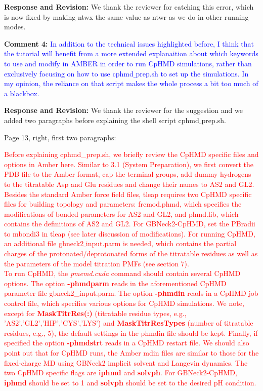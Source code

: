 \documentclass[11pt,letterpaper]{businessletter}
\begin{document}
\begin{letter}
\textbf{Response and Revision:} 
We thank the reviewer for catching this error, which is now fixed by making ntwx the same value as ntwr 
as we do in other running modes. 


\textbf{Comment 4:}
\textcolor{Blue}{
In addition to the technical issues highlighted before, I think that the tutorial will benefit from a more extended explanaition about which keywords to use and modify in AMBER in order to run CpHMD simulations, rather than exclusively focusing on how to use cphmd$\_$prep.sh to set up the simulations. In my opinion, the reliance on that script makes the whole process a bit too much of a blackbox.
}

\textbf{Response and Revision:} 
We thank the reviewer for the suggestion and we added two paragraphs before explaining the shell script cphmd$\_$prep.sh.

Page 13, right, first two paragraphs:

\textcolor{red}{
\indent Before explaining {cphmd\_prep.sh}, we briefly review the CpHMD specific files and options in Amber here.
Similar to 3.1 (System Preparation), we first convert the PDB file to the Amber format, cap the terminal groups, add dummy hydrogens to the titratable Asp and Glu residues and change their names to AS2 and GL2.
Besides the standard Amber force field files, tleap requires two CpHMD specific files for building topology and parameters:
{frcmod.phmd},
which specifies the modifications of bonded parameters for AS2 and GL2, 
and {phmd.lib}, which
contains the definitions of AS2 and GL2.
For GBNeck2-CpHMD, set the PBradii to mbondi3 in tleap (see later discussion of modifications). 
For running CpHMD, an additional file
{gbneck2$\_$input.parm} is needed, which contains the
partial charges of the protonated/deprotonated forms of the titratable residues as well as the parameters of the model titration PMFs (see section 7). 
\\
\indent
To run CpHMD, the \textit{pmemd.cuda} command should contain several CpHMD options.
The option
\textbf{-phmdparm} reads in 
the aforementioned CpHMD parameter file {gbneck2\_input.parm}.
The option \textbf{-phmdin} reads in
a CpHMD job control file, which specifies various options for CpHMD simulations. 
We note, except for  
\textbf{MaskTitrRes(:)} (titratable residue types, e.g., 'AS2','GL2','HIP','CYS','LYS')
and \textbf{MaskTitrResTypes} (number of titratable residues, e.g., 5), the default settings in the phmdin file should be kept.
Finally, if specified the option \textbf{-phmdstrt} reads in a CpHMD restart file.
We should also point out that 
for CpHMD runs, the Amber mdin files are
similar to those for the fixed-charge MD using GBNeck2 implicit solvent and Langevin dynamics. 
The two CpHMD specific flags are \textbf{iphmd} and \textbf{solvph}. 
For GBNeck2-CpHMD, \textbf{iphmd} should be set to 1 and \textbf{solvph} should be set to the desired pH condition.
}
 

\end{letter}
\end{document}
